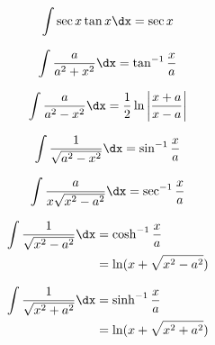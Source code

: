 \begin{center}
\begin{multicols}{2}
		\begin{equation}
			\int \sec x \tan x \dx = \sec x
		\end{equation}
		
		\begin{equation}
			\int \frac{a}{a^2+x^2}\dx = \tan^{-1}\frac{x}{a}
		\end{equation}
		
		\begin{equation}
			\int \frac{a}{a^2-x^2}\dx = \frac{1}{2}\ln\left|\frac{x+a}{x-a}\right|
		\end{equation}
		
		\begin{equation}
			\int \frac{1}{\sqrt{a^2-x^2}} \dx = \sin^{-1} \frac{x}{a}
		\end{equation}
		
		\begin{equation}
			\int \frac{a}{x \sqrt{x^2-a^2}} \dx = \sec^{-1} \frac{x}{a}
		\end{equation}
		
		\begin{align}
			\int \frac{1}{\sqrt{x^2-a^2}} \dx &= \cosh^{-1} \frac{x}{a} \\&= \nonumber \ln (x+\sqrt{x^2-a^2})
		\end{align}
		
		\begin{align}
			\int \frac{1}{\sqrt{x^2+a^2}} \dx &= \sinh^{-1} \frac{x}{a} \\&=\nonumber \ln (x+\sqrt{x^2+a^2})
		\end{align}
		
	\end{multicols}
\end{center}		

